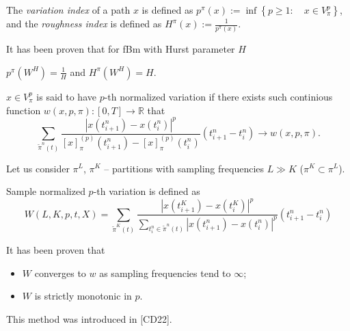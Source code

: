             \begin{frame}{}
                \begin{definition}
                    The \emph{variation index} of a path $x$ is defined as $p^\pi(x) := \inf \left\{p\geq 1 \colon \quad x\in V_\pi^p\right\}$, and the \emph{roughness index} is defined as $H^\pi(x):=\frac{1}{p^\pi(x)}$.
                \end{definition}
                It has been proven that for fBm with Hurst parameter $H$ 
                
                \noindent $p^\pi(W^H) = \frac{1}{H}$ and $H^\pi(W^H) = H$.
                
                \begin{definition}
                    $x\in V_\pi^p$ is said to have $p$-th normalized variation if there exists such continious function $w(x, p, \pi)\colon [0, T] \to \mathbb{R}$ that
                    \begin{equation}
                        \sum_{\tilde\pi^n(t)}\frac{\left|x(t_{i+1}^n) - x(t_i^n)\right|^p}{\left[x\right]_{\pi}^{(p)}(t_{i+1}^n)-\left[x\right]_{\pi}^{(p)}(t_i^n)} (t_{i+1}^n-t_{i}^n) \to w(x, p, \pi).
                    \end{equation}
                \end{definition}
            \end{frame}

            \begin{frame}{}
                Let us consider $\pi^L$, $\pi^K$ -- partitions with sampling frequencies $L\gg K$ ($\pi^K \subset \pi^L$).
                \begin{definition}
                    Sample normalized $p$-th variation is defined as
                    \begin{equation}
                        W(L, K, p, t, X) = \sum_{\tilde\pi^K(t)}\frac{\left|x(t_{i+1}^K) - x(t_i^K)\right|^p}{\sum_{t_i^n \in \tilde\pi^n(t)} \left|x(t_{i+1}^n) - x(t_i^n)\right|^p} (t_{i+1}^n-t_{i}^n)
                    \end{equation}
                \end{definition}
                It has been proven that\begin{itemize}
                    \item $W$ converges to $w$ as sampling frequencies tend to $\infty$;
                    \item $W$ is strictly monotonic in $p$.
                \end{itemize}
                This method was introduced in [CD22].
            \end{frame}
            

